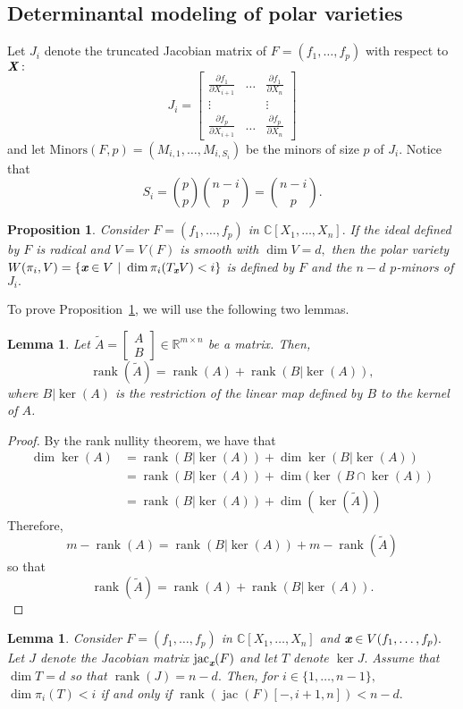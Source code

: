 \documentclass[a4paper]{article}
\def\Xb{\textit{\textbf{X}}}
\def\xb{\textit{\textbf{x}}}
\def\At{\widetilde{A}}
\DeclareMathOperator{\jac}{jac}
\DeclareMathOperator{\rank}{rank}
\DeclareMathOperator{\rk}{rank}
\def\minors{\textrm{Minors}(F,p)}
\def\pa{\partial}
\def\C{\mathbb{C}}
\def\bbm{\begin{bmatrix}}
\def\ebm{\end{bmatrix}}
\newtheorem{lemma}[theorem]{Lemma}
\newtheorem{prop}[theorem]{Proposition}
\begin{document}
\subsection{Determinantal modeling of polar varieties} 
Let $J_i$ denote the truncated Jacobian matrix of $F=(f_1,\hdots,f_p)$ with respect to $\Xb:$
\[
J_i = 
\left[ 
\begin{array}{ccc}
\frac{\pa f_1}{\pa X_{i+1}}&\hdots& \frac{\pa f_1}{\pa X_{n}} \\
\vdots& &\vdots\\
\frac{\pa f_p}{\pa X_{i+1}}&\hdots& \frac{\pa f_p}{\pa X_{n}} 
\end{array}
\right] 
\]
and let $\minors = \left(M_{i,1},\hdots,M_{i,S_i}\right)$ be the minors of size $p$ of $J_i$. Notice that
\[
S_i = \binom{p}{p}\binom{n-i}{p}=\binom{n-i}{p}.
\]
%
\begin{prop}\label{prop:3.1}
Consider $F=(f_1,\hdots,f_p)$ in $\C[X_1,\hdots,X_n].$ If the ideal defined by $F$ is radical and $V = V(F)$ is smooth with $\dim V= d,$ then the polar variety $W(\pi_i,V) = \{\xb \in V~|~\dim \pi_i(T_{\xb}V) < i\}$ is defined by $F$ and the $n-d$ $p$-minors of $J_i.$ 
\end{prop}
%
\noindent 
To prove Proposition~\ref{prop:3.1}, we will use the following two lemmas.
%
\begin{lemma}\label{lem:3.2} 
Let $\widetilde{A} = \bbm A \\ B \ebm \in \mathbb{R}^{m\times n}$ be a matrix. Then, 
\[ 
\rank(\widetilde{A}) = 
\rank(A) + \rank(B|\ker(A)),
\]
where $B|\ker(A)$ is the restriction of the linear map defined by $B$ to the kernel of $A$. 
\end{lemma}
%
\begin{proof}
By the rank nullity theorem, we have that \begin{align*} 
\dim \ker(A) &= 
\rank(B|\ker(A)) +
\dim \ker(B| \ker(A)) \\
&= \rank(B|\ker(A)) +
\dim (\ker(B \cap \ker(A)) \\
&= \rank(B|\ker(A)) +
\dim (\ker(\widetilde{A}))
\end{align*}
Therefore, 
\[
m - \rank(A) = \rank(B|\ker(A)) + m - \rank(\At)
\]
so that 
\[
\rank(\At) = \rank(A) + \rank(B| \ker (A)).
\]
\end{proof}
%
%
\begin{lemma}\label{lem:3.3}
Consider $F=(f_1,\hdots,f_p)$ in $\C[X_1,\hdots,X_n]$ and $\xb \in V(f_1,\hdots,f_p).$ Let $J$ denote the Jacobian matrix $\jac_{\xb}( F)$ and let $T$ denote $\ker J.$ Assume that $\dim T = d$ so that $\rank(J) = n-d.$ Then, for $i \in \{1,\hdots,n-1\},$  $\dim\pi_i(T) < i$ if and only if $\rk (\jac(F)[-,i+1,n]) < n-d.$
\end{lemma} 
\end{document}
